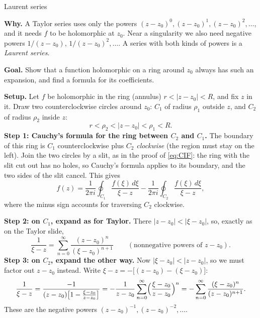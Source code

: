 \documentclass[11pt]{beamer}
\begin{document}
\begin{frame}[allowframebreaks=1.00]{Laurent series}
\footnotesize

\textbf{Why.} A Taylor series uses only the powers \((z-z_0)^0,(z-z_0)^1,(z-z_0)^2,\dots\), and it
needs \(f\) to be holomorphic at \(z_0\). Near a singularity we also need negative powers
\(1/(z-z_0),\,1/(z-z_0)^2,\dots\). A series with both kinds of powers is a \emph{Laurent series}.

\textbf{Goal.} Show that a function holomorphic on a ring around \(z_0\) always has such an
expansion, and find a formula for its coefficients.

\textbf{Setup.} Let \(f\) be holomorphic in the ring (annulus) \(r<|z-z_0|<R\), and fix \(z\) in it.
Draw two counterclockwise circles around \(z_0\): \(C_1\) of radius \(\rho_1\) outside \(z\), and \(C_2\) of
radius \(\rho_2\) inside \(z\):
\[
 r<\rho_2<|z-z_0|<\rho_1<R .
\]
\textbf{Step 1: Cauchy's formula for the ring between \(C_2\) and \(C_1\).} The boundary of this ring
is \(C_1\) counterclockwise plus \(C_2\) \emph{clockwise} (the region must stay on the left). Join
the two circles by a slit, as in the proof of \eqref{eq:CIF}: the ring with the slit cut out has no
holes, so Cauchy's formula applies to its boundary, and the two sides of the slit cancel. This gives
\[
 f(z)=\frac1{2\pi i}\oint_{C_1}\frac{f(\xi)\,d\xi}{\xi-z}-\frac1{2\pi i}\oint_{C_2}\frac{f(\xi)\,d\xi}{\xi-z},
\]
where the minus sign accounts for traversing \(C_2\) clockwise.
\par\framebreak\par
\textbf{Step 2: on \(C_1\), expand as for Taylor.} There \(|z-z_0|<|\xi-z_0|\), so, exactly as on
the Taylor slide,
\[
 \frac1{\xi-z}=\sum_{n=0}^{\infty}\frac{(z-z_0)^n}{(\xi-z_0)^{n+1}}
 \qquad(\text{nonnegative powers of } z-z_0).
\]
\textbf{Step 3: on \(C_2\), expand the other way.} Now \(|\xi-z_0|<|z-z_0|\), so we must factor out
\(z-z_0\) instead. Write \(\xi-z=-\bigl[(z-z_0)-(\xi-z_0)\bigr]\):
\[
 \frac1{\xi-z}=\frac{-1}{(z-z_0)\bigl[1-\frac{\xi-z_0}{z-z_0}\bigr]}
 =-\frac{1}{z-z_0}\sum_{n=0}^{\infty}\Bigl(\frac{\xi-z_0}{z-z_0}\Bigr)^n
 =-\sum_{n=0}^{\infty}\frac{(\xi-z_0)^n}{(z-z_0)^{n+1}} .
\]
These are the negative powers \((z-z_0)^{-1},(z-z_0)^{-2},\dots\).


\end{frame}
\end{document}
